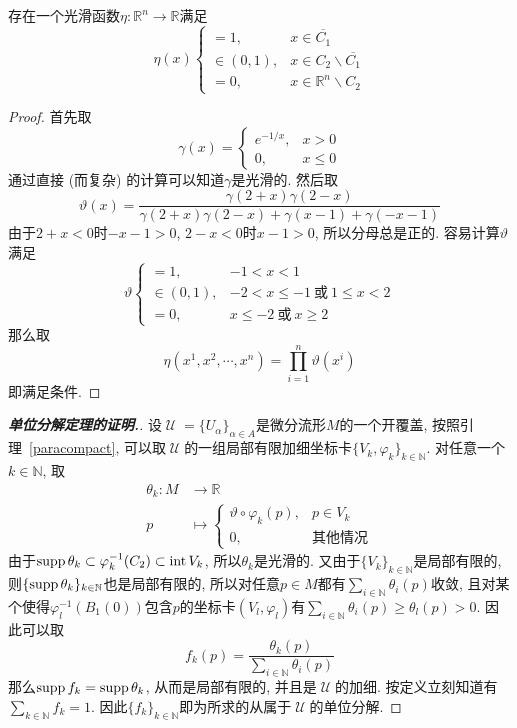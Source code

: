 \begin{lem}\label{urysohn}
    存在一个光滑函数$\eta:\mathbb{R}^n\to\mathbb{R}$满足
    \[\eta(x)\begin{cases}
        =1, & x\in \overline{C_1}\\
        \in(0,1), & x\in C_2\backslash\overline{C_1}\\
        =0, & x\in\mathbb{R}^n\backslash C_2
    \end{cases}\]
\end{lem}

\begin{proof}
    首先取
    \[\gamma(x)=\begin{cases}
        e^{-1/x}, & x>0\\
        0, & x\leq 0
    \end{cases}\]
    通过直接 (而复杂) 的计算可以知道$\gamma$是光滑的.
    然后取
    \[\vartheta(x)=\frac{\gamma(2+x)\gamma(2-x)}{\gamma(2+x)\gamma(2-x)+\gamma(x-1)+\gamma(-x-1)}\]
    由于$2+x<0$时$-x-1>0$, $2-x<0$时$x-1>0$, 所以分母总是正的.
    容易计算$\vartheta$满足
    \[\vartheta\begin{cases}
        =1, & -1<x<1\\
        \in(0,1), & -2<x\leq -1\ \text{或}\ 1\leq x<2\\
        =0, & x\leq -2\ \text{或}\ x\geq 2
    \end{cases}\]
    那么取
    \[\eta(x^1,x^2,\cdots,x^n)=\prod_{i=1}^n\vartheta(x^i)\]
    即满足条件.
\end{proof}

\begin{proof}[{\bf 单位分解定理的证明.}]
    设$\mscrU=\{U_\alpha\}_{\alpha\in A}$是微分流形$M$的一个开覆盖, 按照引理~\ref{paracompact}, 可以取$\mscrU$的一组局部有限加细坐标卡$\{V_k,\varphi_k\}_{k\in\mathbb{N}}$.
    对任意一个$k\in\mathbb{N}$, 取
    \begin{align*}
        \theta_k:M&\to\mathbb{R}\\
        p&\mapsto\left\{\begin{array}{ll}
            \vartheta\circ\varphi_k(p), & p\in V_k\\
            0, & \text{其他情况}
        \end{array}\right.
    \end{align*}
    由于$\operatorname{supp}{\theta_k}\subset\varphi_k^{-1}(C_2)\subset\operatorname{int} V_k$, 所以$\theta_k$是光滑的.
    又由于$\{V_k\}_{k\in\mathbb{N}}$是局部有限的, 则$\{\operatorname{supp}{\theta_k}\}_{k\in\mathbb{N}}$也是局部有限的, 所以对任意$p\in M$都有$\displaystyle\sum_{i\in\mathbb{N}}\theta_i(p)$收敛, 且对某个使得$\varphi_l^{-1}(B_1(0))$包含$p$的坐标卡$(V_l,\varphi_l)$有$\displaystyle\sum_{i\in\mathbb{N}}\theta_i(p)\geq\theta_l(p)>0$.
    因此可以取
    \[f_k(p)=\frac{\theta_k(p)}{\sum_{i\in\mathbb{N}}\theta_i(p)}\]
    那么$\operatorname{supp}{f_k}=\operatorname{supp}\theta_k$, 从而是局部有限的, 并且是$\mscrU$的加细.
    按定义立刻知道有$\displaystyle\sum_{k\in\mathbb{N}}f_k=1$.
    因此$\{f_k\}_{k\in\mathbb{N}}$即为所求的从属于$\mscrU$的单位分解.
\end{proof}

